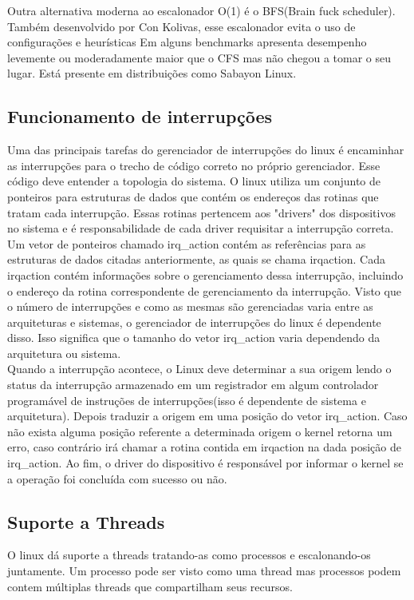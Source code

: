 \documentclass[conference]{IEEEtran}
\begin{document}
Outra alternativa moderna ao escalonador O(1) é o BFS(Brain fuck scheduler). Também desenvolvido por Con Kolivas, esse escalonador evita o uso de configurações e heurísticas Em alguns benchmarks apresenta desempenho levemente ou moderadamente maior que o CFS mas não chegou a tomar o seu lugar. Está presente em distribuições como Sabayon Linux\cite{LinuxSchedulerBFS}.
\cite{LinuxSchedulerWiki}

\subsection{Funcionamento de interrupções}\label{sec:LinuxInt}
Uma das principais tarefas do gerenciador de interrupções do linux é encaminhar as interrupções para o trecho de código correto no próprio gerenciador. Esse código deve entender a topologia do sistema. O linux utiliza um conjunto de ponteiros para estruturas de dados que contém os endereços das rotinas que tratam cada interrupção. Essas rotinas pertencem aos "drivers" dos dispositivos no sistema e é responsabilidade de cada driver requisitar a interrupção correta. Um vetor de ponteiros chamado irq\_action contém as referências para as estruturas de dados citadas anteriormente, as quais se chama irqaction. Cada irqaction contém informações sobre o gerenciamento dessa interrupção, incluindo o endereço da rotina correspondente de gerenciamento da interrupção. Visto que o número de interrupções e como as mesmas são gerenciadas varia entre as arquiteturas e sistemas, o gerenciador de interrupções do linux é dependente disso. Isso significa que o tamanho do vetor irq\_action varia dependendo da arquitetura ou sistema.\\

Quando a interrupção acontece, o Linux deve determinar a sua origem lendo o status da interrupção armazenado em um registrador em algum controlador programável de instruções de interrupções(isso é dependente de sistema e arquitetura). Depois traduzir a origem em uma posição do vetor irq\_action. Caso não exista alguma posição referente a determinada origem o kernel retorna um erro, caso contrário irá chamar a rotina contida em irqaction na dada posição de irq\_action. Ao fim, o driver do dispositivo é responsável por informar o kernel se a operação foi concluída com sucesso ou não\cite{InterruptsLinux}.

\subsection{Suporte a Threads}\label{sec:LinuxThreads}
O linux dá suporte a threads tratando-as como processos e escalonando-os juntamente. Um processo pode ser visto como uma thread mas
processos podem contem múltiplas threads que compartilham seus recursos\cite{LinuxSchedulerIBM}.
\end{document}
